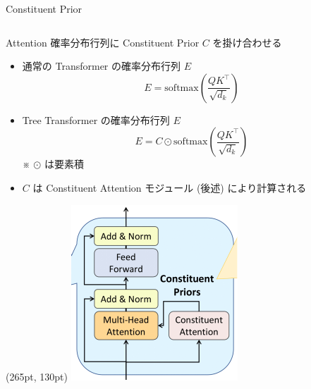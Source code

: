 \documentclass[unicode, 12pt, aspectratio=43]{beamer}
\begin{document}
\begin{frame}[label={sec:org5a00731}]{Constituent Prior}
\begin{columns}
\begin{column}{1.0\columnwidth}
\begin{block}{Attention 確率分布行列に Constituent Prior \(C\) を掛け合わせる}
\begin{itemize}
\item 通常の Transformer の確率分布行列 \(E\)
\begin{equation*}
  E = \mathrm{softmax}(\frac{QK^\top}{\sqrt{d_k}})
\end{equation*}

\item Tree Transformer の確率分布行列 \(E\)
\begin{equation*}
  E = C \odot \mathrm{softmax}(\frac{QK^\top}{\sqrt{d_k}})
\end{equation*}
※ \(\odot\) は要素積
\vspace{0.2cm}
\item \(C\) は Constituent Attention モジュール (後述) により計算される
\end{itemize}

\begin{textblock*}{0.3\linewidth}(265pt, 130pt)
    \centering
    \includegraphics[width=\linewidth]{./figure/Figure1_b.pdf}
\end{textblock*}
\end{block}
\end{column}
\end{columns}
\end{frame}
\end{document}
